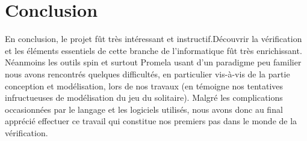 \documentclass[12pt, a4paper]{report}
\begin{document}
\section{Conclusion}


En conclusion, le projet fût très intéressant et instructif.Découvrir la vérification et les éléments essentiels de cette branche de l'informatique fût très enrichissant. Néanmoins les outils spin et surtout Promela usant d'un paradigme peu familier nous avons rencontrés quelques difficultés, en particulier vis-à-vis de la partie conception et modélisation, lors de nos travaux (en témoigne nos tentatives infructueuses de modélisation du jeu du solitaire). Malgré les complications occasionnées par le langage et les logiciels utilisés, nous avons donc au final apprécié effectuer ce travail qui constitue nos premiers pas dans le monde de la vérification. 
\end{document}
